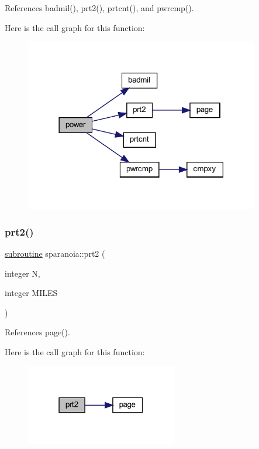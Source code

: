 References badmil(), prt2(), prtcnt(), and pwrcmp().

Here is the call graph for this function\+:
\nopagebreak
\begin{figure}[H]
\begin{center}
\leavevmode
\includegraphics[width=290pt]{sparanoia_8f90_aa0f6d55a5569e0c070c918b0716dc073_cgraph}
\end{center}
\end{figure}
\mbox{\label{sparanoia_8f90_a4366a5bd15fdd00f94aacbdc95b58930}} 
\subsubsection{\texorpdfstring{prt2()}{prt2()}}
{\footnotesize\ttfamily \hyperlink{M__stopwatch_83_8txt_acfbcff50169d691ff02d4a123ed70482}{subroutine} sparanoia\+::prt2 (\begin{DoxyParamCaption}\item[{integer}]{N,  }\item[{integer}]{M\+I\+L\+ES }\end{DoxyParamCaption})}



References page().

Here is the call graph for this function\+:
\nopagebreak
\begin{figure}[H]
\begin{center}
\leavevmode
\includegraphics[width=187pt]{sparanoia_8f90_a4366a5bd15fdd00f94aacbdc95b58930_cgraph}
\end{center}
\end{figure}
\mbox{\label{sparanoia_8f90_a4613c6de1358a9fe77d1a9f4aaa8e1c6}} 
